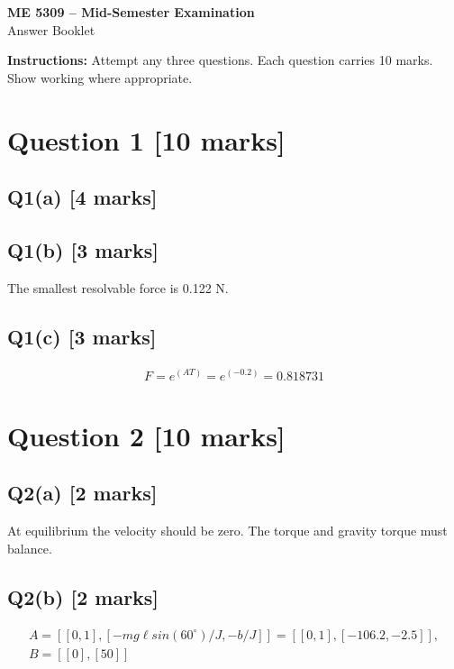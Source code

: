 \documentclass[11pt,a4paper]{article}
\begin{document}
\begin{center}
{\Large\bfseries ME 5309 -- Mid-Semester Examination}\\[3pt]
{\large Answer Booklet}\\[8pt]
\end{center}
\textbf{Instructions:} Attempt any three questions. Each question carries 10 marks. Show working where appropriate.
\section*{Question 1 \hfill [10 marks]}
\subsection*{Q1(a) \hfill [4 marks]}

\vspace{2mm}

\subsection*{Q1(b) \hfill [3 marks]}

The smallest resolvable force is 0.122 N.

\subsection*{Q1(c) \hfill [3 marks]}

\[\begin{aligned}F = e^(AT) = e^(-0.2) = 0.818731\end{aligned}\]

\section*{Question 2 \hfill [10 marks]}
\subsection*{Q2(a) \hfill [2 marks]}

At equilibrium the velocity should be zero.
The torque and gravity torque must balance.

\subsection*{Q2(b) \hfill [2 marks]}

\[\begin{aligned}A = [[0,1], [-mg\ell sin(60^{\circ})/J, -b/J]] = [[0,1], [-106.2, -2.5]],\\ B = [[0],[50]]\end{aligned}\]
\end{document}
